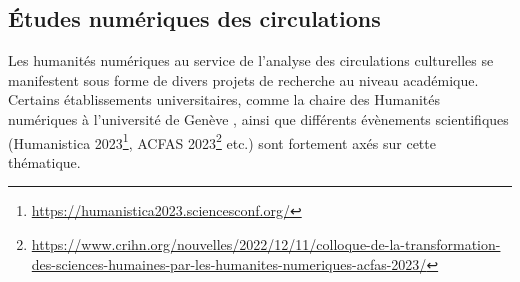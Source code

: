 \subsection{Études numériques des circulations}
Les humanités numériques au service de l'analyse des circulations culturelles se manifestent sous forme de divers projets de recherche au niveau académique. Certains établissements universitaires, comme la chaire des Humanités numériques à l'université de Genève \citep{joyeux2022circulations}, ainsi que différents évènements scientifiques  (Humanistica 2023\footnote{\url{https://humanistica2023.sciencesconf.org/}}, \textsc{ACFAS} 2023\footnote{\url{https://www.crihn.org/nouvelles/2022/12/11/colloque-de-la-transformation-des-sciences-humaines-par-les-humanites-numeriques-acfas-2023/}} etc.) sont fortement axés sur cette thématique.  
